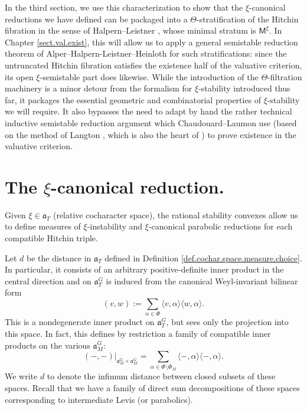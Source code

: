 \documentclass[openany]{amsbook}
\theoremstyle{definition}
\theoremstyle{remark}
\numberwithin{equation}{section}
\renewcommand{\-}{\operatorname{-}}
\renewcommand{\a}{\mathfrak{a}}
\newcommand{\bM}{\mathsf{M}}
\begin{document}
In the third section, we use this characterization to show that the $\xi$-canonical reductions we have defined can be packaged into a $\Theta$-stratification of the Hitchin fibration in the sense of Halpern--Leistner \cite{HalpernLeistnerInstability}, whose minimal stratum is $\bM^{\xi}$. In Chapter \ref{sect.val.exist}, this will allow us to apply a general semistable reduction theorem of Alper--Halpern-Leistner--Heinloth \cite{AHLHModuliForStacks} for such stratifications: since the untruncated Hitchin fibration satisfies the existence half of the valuative criterion, its open $\xi$-semistable part does likewise. While the introduction of the $\Theta$-filtration machinery is a minor detour from the formalism for $\xi$-stability introduced thus far, it packages the essential geometric and combinatorial properties of $\xi$-stability we will require. It also bypasses the need to adapt by hand the rather technical inductive semistable reduction argument which Chaudouard--Laumon use (based on the method of Langton \cite{langton}, which is also the heart of \cite{AHLHModuliForStacks}) to prove existence in the valuative criterion.

\section{\texorpdfstring{The $\xi$-canonical reduction.}{The xi-canonical reduction.}}\label{sect.xi.canonical.red}

Given $\xi \in \a_T$ (relative cocharacter space), the rational stability convexes allow us to define measures of $\xi$-instability and $\xi$-canonical parabolic reductions for each compatible Hitchin triple. 

Let $d$ be the distance in $\a_{T}$ defined in Definition \ref{def.cochar.space.measure.choice}. In particular, it consists of an arbitrary positive-definite inner product in the central direction and on $\a_T^G$ is induced from the canonical Weyl-invariant bilinear form
$$
    (v,w) := \sum_{\alpha \in \Phi} \langle v, \alpha \rangle \langle w, \alpha \rangle.
$$
This is a nondegenerate inner product on $\a_T^G$, but sees only the projection into this space. In fact, this defines by restriction a family of compatible inner products on the various $\a_M^G$:
$$
    (-,-)|_{\a_M^G \times \a_M^G} = \sum_{\alpha \in \Phi \setminus \Phi_M} \langle -, \alpha \rangle \langle -, \alpha \rangle.
$$
We write $d$ to denote the infimum distance between closed subsets of these spaces. Recall that we have a family of direct sum decompositions of these spaces corresponding to intermediate Levis (or parabolics).
\end{document}
